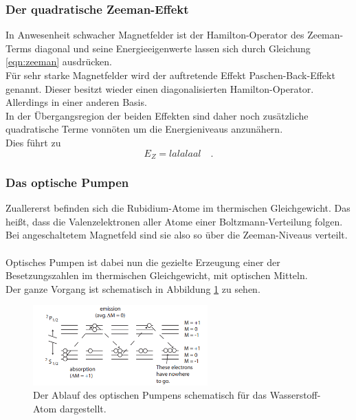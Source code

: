 \subsubsection{Der quadratische Zeeman-Effekt}

\noindent
In Anwesenheit schwacher Magnetfelder ist der Hamilton-Operator des Zeeman-Terms diagonal und seine Energieeigenwerte lassen sich durch Gleichung \ref{eqn:zeeman} ausdrücken.\\
Für sehr starke Magnetfelder wird der auftretende Effekt Paschen-Back-Effekt genannt. Dieser besitzt wieder einen diagonalisierten Hamilton-Operator. Allerdings in einer anderen Basis.\\
In der Übergangsregion der beiden Effekten sind daher noch zusätzliche quadratische Terme vonnöten um die Energieniveaus anzunähern.\\
Dies führt zu 
\begin{equation*}
 E_{Z} = lalalaal  \quad . 
\end{equation*} 


\subsubsection{Das optische Pumpen}

\noindent
Zuallererst befinden sich die Rubidium-Atome im thermischen Gleichgewicht. 
Das heißt, dass die Valenzelektronen aller Atome einer Boltzmann-Verteilung folgen. 
Bei angeschaltetem Magnetfeld sind sie also so über die Zeeman-Niveaus verteilt.\\\\
Optisches Pumpen ist dabei nun die gezielte Erzeugung einer der Besetzungszahlen im thermischen Gleichgewicht, mit optischen Mitteln.\\
Der ganze Vorgang ist schematisch in Abbildung \ref{img:pumpitup} zu sehen.

\begin{figure}[H]
    \centering
    \includegraphics[width=0.6\textwidth]{latex/images/pumping.PNG}
    \caption{Der Ablauf des optischen Pumpens schematisch für das Wasserstoff-Atom dargestellt\protect \cite{pump_1}.}
    \label{img:pumpitup}
\end{figure}

